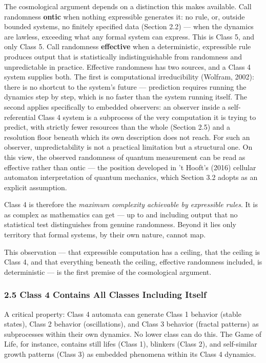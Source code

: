 \documentclass[
]{article}
\begin{document}
The cosmological argument depends on a distinction this makes available.
Call randomness \textbf{ontic} when nothing expressible generates it: no
rule, or, outside bounded systems, no finitely specified data (Section
2.2) --- when the dynamics are lawless, exceeding what any formal system
can express. This is Class 5, and only Class 5. Call randomness
\textbf{effective} when a deterministic, expressible rule produces
output that is statistically indistinguishable from randomness and
unpredictable in practice. Effective randomness has two sources, and a
Class 4 system supplies both. The first is computational irreducibility
(Wolfram, 2002): there is no shortcut to the system's future ---
prediction requires running the dynamics step by step, which is no
faster than the system running itself. The second applies specifically
to embedded observers: an observer inside a self-referential Class 4
system is a subprocess of the very computation it is trying to predict,
with strictly fewer resources than the whole (Section 2.5) and a
resolution floor beneath which its own description does not reach. For
such an observer, unpredictability is not a practical limitation but a
structural one. On this view, the observed randomness of quantum
measurement can be read as effective rather than ontic --- the position
developed in 't Hooft's (2016) cellular automaton interpretation of
quantum mechanics, which Section 3.2 adopts as an explicit assumption.

Class 4 is therefore the \emph{maximum complexity achievable by
expressible rules}. It is as complex as mathematics can get --- up to
and including output that no statistical test distinguishes from genuine
randomness. Beyond it lies only territory that formal systems, by their
own nature, cannot map.

This observation --- that expressible computation has a ceiling, that
the ceiling is Class 4, and that everything beneath the ceiling,
effective randomness included, is deterministic --- is the first premise
of the cosmological argument.

\hypertarget{class-4-contains-all-classes-including-itself}{%
\subsubsection{2.5 Class 4 Contains All Classes Including
Itself}\label{class-4-contains-all-classes-including-itself}}

A critical property: Class 4 automata can generate Class 1 behavior
(stable states), Class 2 behavior (oscillations), and Class 3 behavior
(fractal patterns) as subprocesses within their own dynamics. No lower
class can do this. The Game of Life, for instance, contains still lifes
(Class 1), blinkers (Class 2), and self-similar growth patterns (Class
3) as embedded phenomena within its Class 4 dynamics.
\end{document}

